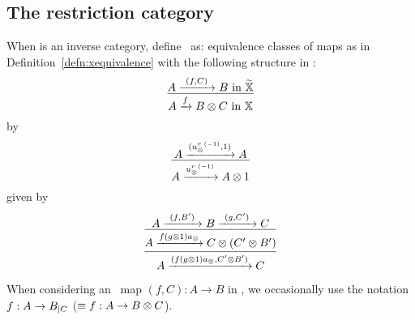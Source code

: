 \subsection{The restriction category \hypXt} %
\label{sub:the_restriction_category_hypxt}

\begin{definition}\label{def:xt}
  When \X is an inverse category, define \Xt\ as:
  {
    equivalence classes of maps as in Definition~\ref{defn:xequivalence} with the following
    structure in \X: %
    \[
      \infer{A\xrightarrow{f} B\*C \text{ in }\X}{A \xrightarrow{\ (f,C)\ } B \text{ in } \Xt}
      \]
  }
  {%
    by
    \[
      \infer{A\xrightarrow{\inv{u_{\*}^r}}A\* 1}
            {A \xrightarrow{(\inv{u_{\*}^r}, 1)} A}
    \]
  }
  {%
    given by
    \[
      \infer{
        \infer{A\xrightarrow{(f (g\*1) a_{\*},C' \* B')} C}
              {A\xrightarrow{f (g\*1) a_{\*}} C \* (C' \* B')}
            }
            {A \xrightarrow{\ (f,B')\ } B \xrightarrow{\ (g,C')\ } C}
    \]
  }

\end{definition}

When considering an \Xt\ map $(f,C):A\to B$ in \X, we occasionally use the notation $f:A\to
{B}_{|{C}}$ ($\equiv f:A\to B\otimes C$).

